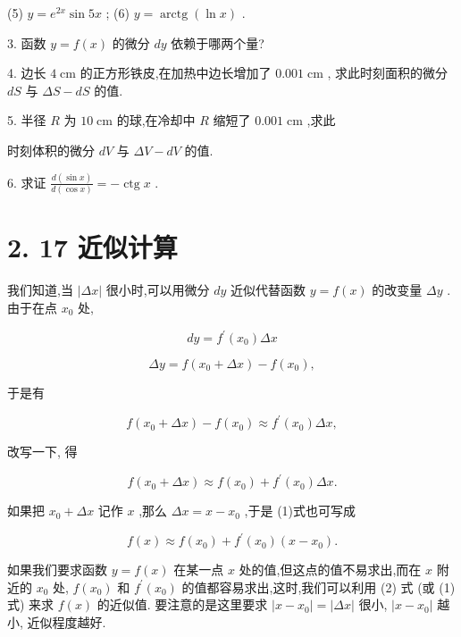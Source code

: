 \documentclass[10pt]{article}
\begin{document}
(5) \(y = {e}^{2x}\sin {5x}\) ; (6) \(y = \operatorname{arctg}\left( {\ln x}\right)\) .

3. 函数 \(y = f\left( x\right)\) 的微分 \({dy}\) 依赖于哪两个量?

4. 边长 \(4\mathrm{\;{cm}}\) 的正方形铁皮,在加热中边长增加了 \({0.001}\mathrm{\;{cm}}\) , 求此时刻面积的微分 \({dS}\) 与 \({\Delta S} - {dS}\) 的值.

5. 半径 \(R\) 为 \({10}\mathrm{\;{cm}}\) 的球,在冷却中 \(R\) 缩短了 \({0.001}\mathrm{\;{cm}}\) ,求此

时刻体积的微分 \({dV}\) 与 \({\Delta V} - {dV}\) 的值.

6. 求证 \(\frac{d\left( {\sin x}\right) }{d\left( {\cos x}\right) } = - \operatorname{ctg}x\) .

\section*{2. 17 近似计算}

我们知道,当 \(\left| {\Delta x}\right|\) 很小时,可以用微分 \({dy}\) 近似代替函数 \(y = f\left( x\right)\) 的改变量 \({\Delta y}\) . 由于在点 \({x}_{0}\) 处,

\[
{dy} = {f}^{\prime }\left( {x}_{0}\right) {\Delta x}
\]

\[
{\Delta y} = f\left( {{x}_{0} + {\Delta x}}\right) - f\left( {x}_{0}\right) ,
\]

于是有

\[
f\left( {{x}_{0} + {\Delta x}}\right) - f\left( {x}_{0}\right) \approx {f}^{\prime }\left( {x}_{0}\right) {\Delta x},
\]

改写一下, 得

\[
f\left( {{x}_{0} + {\Delta x}}\right) \approx f\left( {x}_{0}\right) + {f}^{\prime }\left( {x}_{0}\right) {\Delta x}. \tag{1}
\]

如果把 \({x}_{0} + {\Delta x}\) 记作 \(x\) ,那么 \({\Delta x} = x - {x}_{0}\) ,于是 (1)式也可写成

\[
f\left( x\right) \approx f\left( {x}_{0}\right) + {f}^{\prime }\left( {x}_{0}\right) \left( {x - {x}_{0}}\right) . \tag{2}
\]

如果我们要求函数 \(y = f\left( x\right)\) 在某一点 \(x\) 处的值,但这点的值不易求出,而在 \(x\) 附近的 \({x}_{0}\) 处, \(f\left( {x}_{0}\right)\) 和 \({f}^{\prime }\left( {x}_{0}\right)\) 的值都容易求出,这时,我们可以利用 (2) 式 (或 (1) 式) 来求 \(f\left( x\right)\) 的近似值. 要注意的是这里要求 \(\left| {x - {x}_{0}}\right| = \left| {\Delta x}\right|\) 很小, \(\left| {x - {x}_{0}}\right|\) 越小, 近似程度越好.
\end{document}
